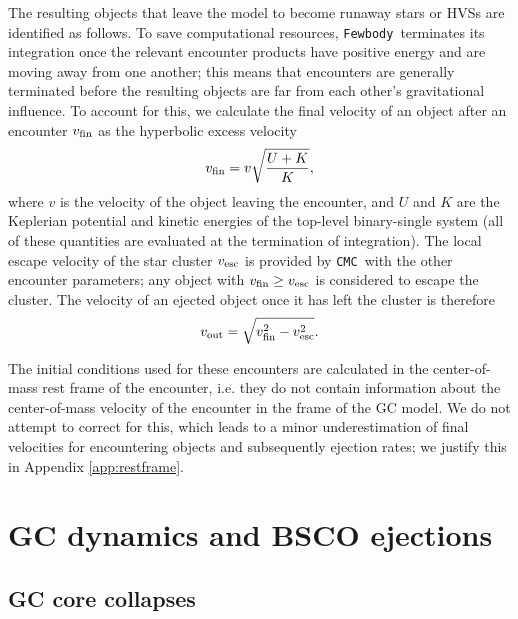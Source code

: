 \documentclass[twocolumn]{aastex631}
\newcommand{\CMC}{\texttt{CMC}}
\newcommand{\fewbody}{\texttt{Fewbody}}
\begin{document}
The resulting objects that leave the model to become runaway stars or HVSs are identified as follows.
To save computational resources, \fewbody\ terminates its integration once the relevant encounter products have positive energy and are moving away from one another; this means that encounters are generally terminated before the resulting objects are far from each other's gravitational influence.
To account for this, we calculate the final velocity of an object after an encounter $v_{\rm fin}$ as the hyperbolic excess velocity
\begin{equation}
    v_{\rm fin} = v \sqrt{\frac{U + K}{K}},
\end{equation}
\noindent where $v$ is the velocity of the object leaving the encounter, and $U$ and $K$ are the Keplerian potential and kinetic energies of the top-level binary-single system (all of these quantities are evaluated at the termination of integration).
The local escape velocity of the star cluster $v_{\rm esc}$ is provided by \CMC\ with the other encounter parameters; any object with $v_{\rm fin} \ge v_{\rm esc}$ is considered to escape the cluster.
The velocity of an ejected object once it has left the cluster is therefore
\begin{equation}
    v_{\rm out} = \sqrt{v_{\rm fin}^2 - v_{\rm esc}^2}.
\end{equation}

The initial conditions used for these encounters are calculated in the center-of-mass rest frame of the encounter, i.e. they do not contain information about the center-of-mass velocity of the encounter in the frame of the GC model.
We do not attempt to correct for this, which leads to a minor underestimation of final velocities for encountering objects and subsequently ejection rates; we justify this in Appendix \ref{app:restframe}.

\section{GC dynamics and BSCO ejections} \label{sec:gcdyns}

\subsection{GC core collapses} \label{subsec:cc}
\end{document}
